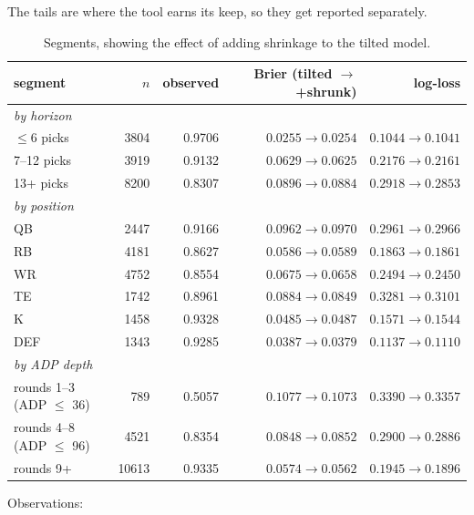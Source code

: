 \documentclass[10pt,a4paper]{article}
\theoremstyle{plain}
\theoremstyle{definition}
\theoremstyle{remark}
\begin{document}
The tails are where the tool earns its keep, so they get reported separately.

\begin{table}[htbp]
\centering
\small
\begin{tabular}{lrrrr}
\toprule
segment & $n$ & observed & Brier (tilted $\to$ +shrunk) & log-loss \\
\midrule
\multicolumn{5}{l}{\emph{by horizon}}\\
$\le 6$ picks & 3804 & 0.9706 & $0.0255 \to 0.0254$ & $0.1044 \to 0.1041$ \\
7--12 picks   & 3919 & 0.9132 & $0.0629 \to 0.0625$ & $0.2176 \to 0.2161$ \\
13+ picks     & 8200 & 0.8307 & $0.0896 \to 0.0884$ & $0.2918 \to 0.2853$ \\
\midrule
\multicolumn{5}{l}{\emph{by position}}\\
QB  & 2447 & 0.9166 & $0.0962 \to 0.0970$ & $0.2961 \to 0.2966$ \\
RB  & 4181 & 0.8627 & $0.0586 \to 0.0589$ & $0.1863 \to 0.1861$ \\
WR  & 4752 & 0.8554 & $0.0675 \to 0.0658$ & $0.2494 \to 0.2450$ \\
TE  & 1742 & 0.8961 & $0.0884 \to 0.0849$ & $0.3281 \to 0.3101$ \\
K   & 1458 & 0.9328 & $0.0485 \to 0.0487$ & $0.1571 \to 0.1544$ \\
DEF & 1343 & 0.9285 & $0.0387 \to 0.0379$ & $0.1137 \to 0.1110$ \\
\midrule
\multicolumn{5}{l}{\emph{by ADP depth}}\\
rounds 1--3 (ADP $\le$ 36) & 789 & 0.5057 & $0.1077 \to 0.1073$ & $0.3390 \to 0.3357$ \\
rounds 4--8 (ADP $\le$ 96) & 4521 & 0.8354 & $0.0848 \to 0.0852$ & $0.2900 \to 0.2886$ \\
rounds 9+                  & 10613 & 0.9335 & $0.0574 \to 0.0562$ & $0.1945 \to 0.1896$ \\
\bottomrule
\end{tabular}
\caption{Segments, showing the effect of adding shrinkage to the tilted model.}
\label{tab:segments}
\end{table}

Observations:
\end{document}
